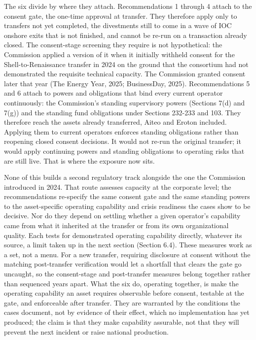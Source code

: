 The six divide by where they attach. Recommendations 1 through 4 attach
to the consent gate, the one-time approval at transfer. They therefore
apply only to transfers not yet completed, the divestments still to come
in a wave of IOC onshore exits that is not finished, and cannot be
re-run on a transaction already closed. The consent-stage screening they
require is not hypothetical: the Commission applied a version of it when
it initially withheld consent for the Shell-to-Renaissance transfer in
2024 on the ground that the consortium had not demonstrated the
requisite technical capacity. The Commission granted consent later that
year (The Energy Year, 2025; BusinessDay, 2025). Recommendations 5 and 6
attach to powers and obligations that bind every current operator
continuously: the Commission's standing supervisory powers (Sections
7(d) and 7(g)) and the standing fund obligations under Sections 232-233
and 103. They therefore reach the assets already transferred, Aiteo and
Eroton included. Applying them to current operators enforces standing
obligations rather than reopening closed consent decisions. It would not
re-run the original transfer; it would apply continuing powers and
standing obligations to operating risks that are still live. That is
where the exposure now sits.

None of this builds a second regulatory track alongside the one the
Commission introduced in 2024. That route assesses capacity at the
corporate level; the recommendations re-specify the same consent gate
and the same standing powers to the asset-specific operating capability
and crisis readiness the cases show to be decisive. Nor do they depend
on settling whether a given operator's capability came from what it
inherited at the transfer or from its own organizational quality. Each
tests for demonstrated operating capability directly, whatever its
source, a limit taken up in the next section (Section 6.4). These
measures work as a set, not a menu. For a new transfer, requiring
disclosure at consent without the matching post-transfer verification
would let a shortfall that clears the gate go uncaught, so the
consent-stage and post-transfer measures belong together rather than
sequenced years apart. What the six do, operating together, is make the
operating capability an asset requires observable before consent,
testable at the gate, and enforceable after transfer. They are warranted
by the conditions the cases document, not by evidence of their effect,
which no implementation has yet produced; the claim is that they make
capability assurable, not that they will prevent the next incident or
raise national production.

